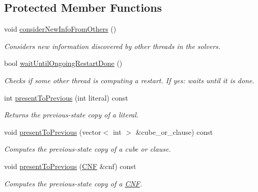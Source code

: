 \subsection*{Protected Member Functions}
\begin{DoxyCompactItemize}
\item 
void \hyperlink{classClauseExplorerSAT_aca3490db608f1c3a4a832e67654dd246}{consider\-New\-Info\-From\-Others} ()
\begin{DoxyCompactList}\small\item\em Considers new information discovered by other threads in the solvers. \end{DoxyCompactList}\item 
bool \hyperlink{classClauseExplorerSAT_a0515689c4464599e0d2d3c350d710d75}{wait\-Until\-Ongoing\-Restart\-Done} ()
\begin{DoxyCompactList}\small\item\em Checks if some other thread is computing a restart. If yes\-: waits until it is done. \end{DoxyCompactList}\item 
int \hyperlink{classClauseExplorerSAT_add20a0c539fdf734af6b0f49f2ba4ad9}{present\-To\-Previous} (int literal) const 
\begin{DoxyCompactList}\small\item\em Returns the previous-\/state copy of a literal. \end{DoxyCompactList}\item 
void \hyperlink{classClauseExplorerSAT_ae91fa23b183aa81824f16c3477643184}{present\-To\-Previous} (vector$<$ int $>$ \&cube\-\_\-or\-\_\-clause) const 
\begin{DoxyCompactList}\small\item\em Computes the previous-\/state copy of a cube or clause. \end{DoxyCompactList}\item 
void \hyperlink{classClauseExplorerSAT_a42355860aef189f2b89356ff347dab4d}{present\-To\-Previous} (\hyperlink{classCNF}{C\-N\-F} \&cnf) const 
\begin{DoxyCompactList}\small\item\em Computes the previous-\/state copy of a \hyperlink{classCNF}{C\-N\-F}. \end{DoxyCompactList}\end{DoxyCompactItemize}
